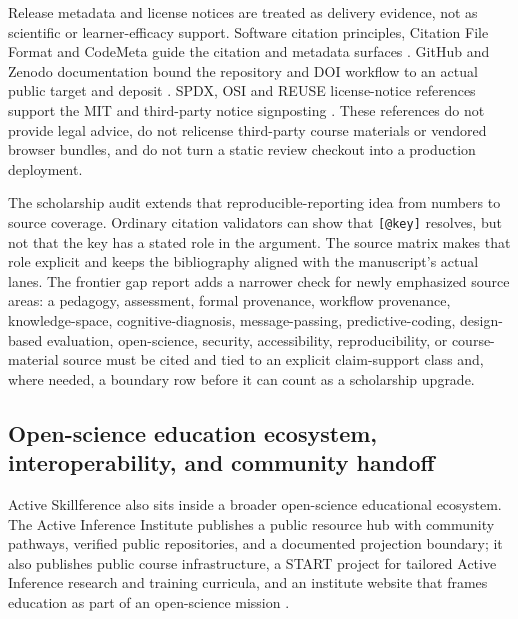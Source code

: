 \documentclass[
  english,
]{article}
\begin{document}
Release metadata and license notices are treated as delivery evidence,
not as scientific or learner-efficacy support. Software citation
principles, Citation File Format and CodeMeta guide the citation and
metadata surfaces
\citep{smith2016softwarecitation, citationfileformat2026, codemeta2026schema}.
GitHub and Zenodo documentation bound the repository and DOI workflow to
an actual public target and deposit
\citep{github2026citingcontent, zenodo2026github}. SPDX, OSI and REUSE
license-notice references support the MIT and third-party notice
signposting
\citep{spdx2026mit, opensourceinitiative2026mit, reuse2024spec}. These
references do not provide legal advice, do not relicense third-party
course materials or vendored browser bundles, and do not turn a static
review checkout into a production deployment.

The scholarship audit extends that reproducible-reporting idea from
numbers to source coverage. Ordinary citation validators can show that
\texttt{{[}@key{]}} resolves, but not that the key has a stated role in
the argument. The source matrix makes that role explicit and keeps the
bibliography aligned with the manuscript's actual lanes. The frontier
gap report adds a narrower check for newly emphasized source areas: a
pedagogy, assessment, formal provenance, workflow provenance,
knowledge-space, cognitive-diagnosis, message-passing,
predictive-coding, design-based evaluation, open-science, security,
accessibility, reproducibility, or course-material source must be cited
and tied to an explicit claim-support class and, where needed, a
boundary row before it can count as a scholarship upgrade.

\subsection{Open-science education ecosystem, interoperability, and
community
handoff}\label{open-science-education-ecosystem-interoperability-and-community-handoff}

Active Skillference also sits inside a broader open-science educational
ecosystem. The Active Inference Institute publishes a public resource
hub with community pathways, verified public repositories, and a
documented projection boundary; it also publishes public course
infrastructure, a START project for tailored Active Inference research
and training curricula, and an institute website that frames education
as part of an open-science mission
\citep{activeinferenceinstitute2026courses, activeinferenceinstitute2026start, activeinferenceinstitute2026home, activeinferenceinstitute2026website}.
\end{document}

